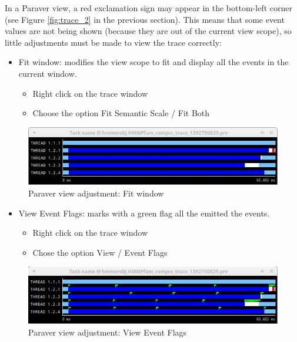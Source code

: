 In a Paraver view, a red exclamation sign may appear in the bottom-left corner (see Figure \ref{fig:trace_2} in the previous section). This means that some event values are not being shown (because they are out of the current view scope), so little adjustments must be made to
view the trace correctly:

\begin{itemize}
 \item Fit window: modifies the view scope to fit and display all the events in the current window.
	\begin{itemize}
	    \item Right click on the trace window
	    \item Choose the option Fit Semantic Scale / Fit Both
	\end{itemize}
\end{itemize}

\begin{figure}[ht!]
  \centering
    \includegraphics[width=1.0\textwidth]{./Sections/3_Visualization/Figures/3.jpeg}
    \caption{Paraver view adjustment: Fit window}
\end{figure}

\begin{itemize} 
 \item View Event Flags: marks with a green flag all the emitted the events.
	\begin{itemize}
	    \item Right click on the trace window
	    \item Chose the option View / Event Flags
	\end{itemize}
\end{itemize}
 
\begin{figure}[ht!]
  \centering
    \includegraphics[width=1.0\textwidth]{./Sections/3_Visualization/Figures/4.jpeg}
    \caption{Paraver view adjustment: View Event Flags}
\end{figure}

